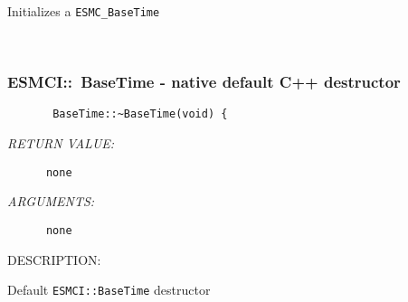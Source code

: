         Initializes a {\tt ESMC\_BaseTime}
   
 
\mbox{}\hrulefill\ 
 
\subsubsection [ESMCI::~BaseTime] {ESMCI::~BaseTime - native default C++ destructor}


  
\begin{verbatim}       BaseTime::~BaseTime(void) {\end{verbatim}{\em RETURN VALUE:}
\begin{verbatim}      none\end{verbatim}{\em ARGUMENTS:}
\begin{verbatim}      none\end{verbatim}
{\sf DESCRIPTION:\\ }


        Default {\tt ESMCI::BaseTime} destructor
  
\setlength{\parskip}{\oldparskip}
\setlength{\parindent}{\oldparindent}
\setlength{\baselineskip}{\oldbaselineskip}
